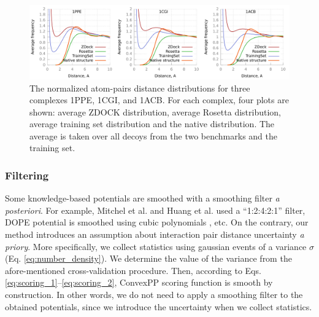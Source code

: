 \begin{figure}[H]
\begin{center}
\includegraphics[scale=0.3]{Scoring/Fig/histAllTogether}
\caption[The normalized atom-pairs distance distributions for three complexes 1PPE, 1CGI, and 1ACB]{
The normalized atom-pairs distance distributions for three complexes 1PPE, 1CGI, and 1ACB. For each complex, four plots are shown:
average ZDOCK distribution, average Rosetta distribution, average training set  distribution and the native distribution.
The average is taken over all decoys from the two benchmarks and the training set. 
}
\label{fig:histAll} 
\end{center}
\end{figure}

\subsubsection{Filtering}

Some knowledge-based potentials are smoothed with a smoothing filter {\em a posteriori}.
For example, Mitchel et al. \cite{mitchell1999bleep} and Huang et al. \cite{Huang2008} used a ``1:2:4:2:1'' filter, 
DOPE potential is smoothed using cubic polynomials \cite{shen2009statistical}, etc. 
%
On the contrary, our method introduces an assumption about interaction pair distance uncertainty {\em a priory}. 
More specifically, we collect statistics using gaussian events of a variance $\sigma$ (Eq. \ref{eq:number_density}). We determine the value of the variance  
from the afore-mentioned cross-validation procedure.
Then, according to Eqs. \ref{eq:scoring_1}--\ref{eq:scoring_2}, ConvexPP scoring function is smooth by construction. 
In other words, we do not need to apply a smoothing 
filter to the obtained potentials, since we introduce the uncertainty when we collect statistics.

